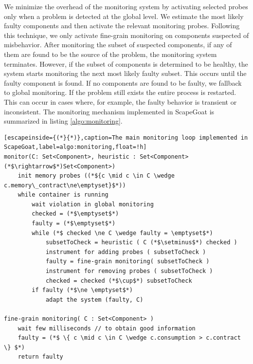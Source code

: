 We minimize the overhead of the monitoring system by activating selected probes only when a problem is detected at the global level.
We estimate the most likely faulty components and then activate the relevant monitoring probes.
Following this technique, we only activate fine-grain monitoring on components suspected of misbehavior.
After monitoring the subset of suspected components, 
if any of them are found to be the source of the problem, the monitoring system terminates.
However, if the subset of components is determined to be healthy, the system starts monitoring the next most likely faulty subset.
This occurs until the faulty component is found.
If no components are found to be faulty, we fallback to global monitoring. If the problem still exists the entire process is restarted. This can occur in cases where, for example, the faulty behavior is transient or inconsistent.
The monitoring mechanism implemented in ScapeGoat is summarized in listing \ref{algo:monitoring}.


\begin{lstlisting}[escapeinside={(*}{*)},caption=The main monitoring loop implemented in ScapeGoat,label=algo:monitoring,float=!h]
monitor(C: Set<Component>, heuristic : Set<Component>(*$\rightarrow$*)Set<Component>)
	init memory probes ((*${c \mid c \in C \wedge c.memory\_contract\ne\emptyset}$*))
	while container is running
		wait violation in global monitoring
		checked = (*$\emptyset$*)
		faulty = (*$\emptyset$*)
		while (*$ checked \ne C \wedge faulty = \emptyset$*)
			subsetToCheck = heuristic ( C (*$\setminus$*) checked )
			instrument for adding probes ( subsetToCheck )
			faulty = fine-grain monitoring( subsetToCheck )
			instrument for removing probes ( subsetToCheck )
			checked = checked (*$\cup$*) subsetToCheck
		if faulty (*$\ne \emptyset$*)
			adapt the system (faulty, C)

fine-grain monitoring( C : Set<Component> )
	wait few milliseconds // to obtain good information
	faulty = (*$ \{ c \mid c \in C \wedge c.consumption > c.contract \} $*)
	return faulty
\end{lstlisting}


